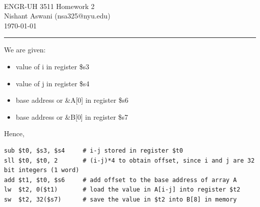 \documentclass[11pt]{exam}
\makeatletter
\newcommand{\myname}{Nishant Aswani}
\newcommand{\myemail}{nsa325@nyu.edu}
\newcommand{\myhwtype}{Homework}
\newcommand{\myhwnum}{2}
\newcommand{\mycoursenumber}{ENGR-UH 3511}
\newcounter{questionCounter}
\newcounter{partCounter}[questionCounter]
\newenvironment{namedquestion}[1]{%
    \addtocounter{questionCounter}{1}%
    \setcounter{partCounter}{0}%
    \vspace{.2in}%
        \noindent{\bf #1}%
    \vspace{0.3em} \hrule \vspace{.1in}%
}{}
\makeatother
\begin{document}
\

{\newpage}


\thispagestyle{plain}
\begin{center}
  {\Large \mycoursenumber{} \myhwtype{} \myhwnum} \\
  \myname{} (\myemail{}) \\
  \today
\end{center}

\setcounter{questionCounter}{0}

\begin{namedquestion}{Question 2.3}

We are given:
\begin{itemize}
    \itemsep0em 
    \item value of i in register \$s3
    \item value of j in register \$s4
    \item base address or \&A[0] in register \$s6
    \item base address or \&B[0] in register \$s7
\end{itemize} 

Hence, 
\begin{verbatim}
sub $t0, $s3, $s4     # i-j stored in register $t0
sll $t0, $t0, 2       # (i-j)*4 to obtain offset, since i and j are 32 bit integers (1 word)
add $t1, $t0, $s6     # add offset to the base address of array A
lw  $t2, 0($t1)       # load the value in A[i-j] into register $t2
sw  $t2, 32($s7)      # save the value in $t2 into B[8] in memory
\end{verbatim}

\end{namedquestion}
\end{document}
